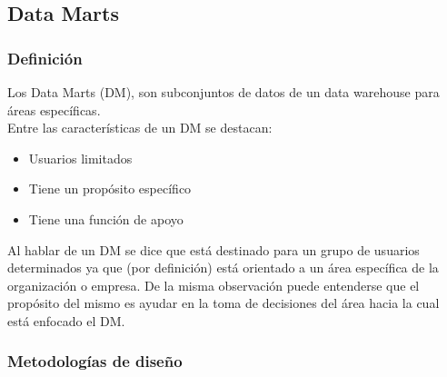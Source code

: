 \documentclass[a4paper,11pt]{article}
\begin{document}
    \subsection{Data Marts}
    
    \subsubsection{Definición}

    Los Data Marts (DM), son subconjuntos de datos de un data warehouse para áreas específicas.\\
    Entre las características de un DM se destacan:
    
    \begin{itemize}
      \item Usuarios limitados
      \item Tiene un propósito específico
      \item Tiene una función de apoyo
    \end{itemize}
    
    Al hablar de un DM se dice que está destinado para un grupo de usuarios determinados ya que (por definición) está orientado a un área específica de la
    organización o empresa. De la misma observación puede entenderse que el propósito del mismo es ayudar en la toma de decisiones del área hacia la cual
    está enfocado el DM.
    
    \subsubsection{Metodologías de diseño}
    
\end{document}
